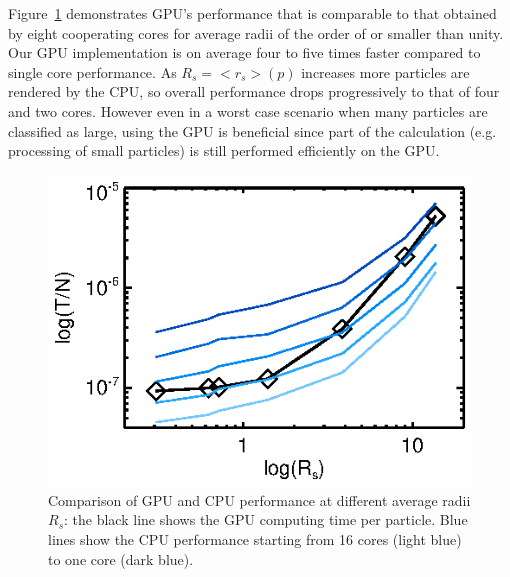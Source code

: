 Figure~\ref{fig:gpucpu} demonstrates GPU's performance that is comparable to that obtained by eight cooperating cores for average radii of the order of or smaller than unity. Our GPU implementation is on average four to five times faster compared to single core performance. As $R_s=<r_s>(p)$ increases more particles are rendered by the CPU, so overall performance drops progressively to that of four and two cores. However even in a worst case scenario when many particles are classified as large, using the GPU is beneficial since part of the calculation (e.g. processing of small particles) is still performed efficiently on the GPU.

\begin{figure}
\centering
\includegraphics[scale=1.0]{part4/Gheller_P013/P013-2.eps}
\caption{Comparison of GPU and CPU performance at different average radii $R_s$: the black line shows the GPU computing time per particle. Blue lines show the CPU performance starting from 16 cores (light blue) to one core (dark blue).}
\label{fig:gpucpu}
\end{figure}


